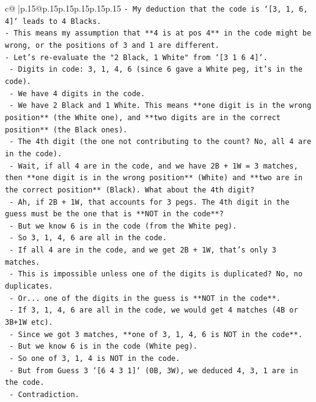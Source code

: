 \documentclass{article}
\begin{document}
{\begin{supertabular}{c@{$\;$}|p{.15\linewidth}@{}p{.15\linewidth}p{.15\linewidth}p{.15\linewidth}p{.15\linewidth}p{.15\linewidth}}
{{{\texttt{{-} My deduction that the code is `{[}3, 1, 6, 4{]}` leads to 4 Blacks.} \\
\texttt{{-} This means my assumption that **4 is at pos 4** in the code might be wrong, or the positions of 3 and 1 are different.} \\
\texttt{{-} Let's re{-}evaluate the "2 Black, 1 White" from `{[}3 1 6 4{]}`.} \\
\texttt{  {-} Digits in code: 3, 1, 4, 6 (since 6 gave a White peg, it's in the code).} \\
\texttt{  {-} We have 4 digits in the code.} \\
\texttt{  {-} We have 2 Black and 1 White. This means **one digit is in the wrong position** (the White one), and **two digits are in the correct position** (the Black ones).} \\
\texttt{  {-} The 4th digit (the one not contributing to the count? No, all 4 are in the code).} \\
\texttt{  {-} Wait, if all 4 are in the code, and we have 2B + 1W = 3 matches, then **one digit is in the wrong position** (White) and **two are in the correct position** (Black). What about the 4th digit?} \\
\texttt{  {-} Ah, if 2B + 1W, that accounts for 3 pegs. The 4th digit in the guess must be the one that is **NOT in the code**?} \\
\texttt{  {-} But we know 6 is in the code (from the White peg).} \\
\texttt{  {-} So 3, 1, 4, 6 are all in the code.} \\
\texttt{  {-} If all 4 are in the code, and we get 2B + 1W, that's only 3 matches.} \\
\texttt{  {-} This is impossible unless one of the digits is duplicated? No, no duplicates.} \\
\texttt{  {-} Or... one of the digits in the guess is **NOT in the code**.} \\
\texttt{  {-} If 3, 1, 4, 6 are all in the code, we would get 4 matches (4B or 3B+1W etc).} \\
\texttt{  {-} Since we got 3 matches, **one of 3, 1, 4, 6 is NOT in the code**.} \\
\texttt{  {-} But we know 6 is in the code (White peg).} \\
\texttt{  {-} So one of 3, 1, 4 is NOT in the code.} \\
\texttt{  {-} But from Guess 3 `{[}6 4 3 1{]}` (0B, 3W), we deduced 4, 3, 1 are in the code.} \\
\texttt{  {-} Contradiction.} \\
}}}
\end{supertabular}}
\end{document}
